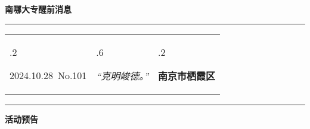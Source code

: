 \documentclass[letterpaper, 12pt]{article}
\begin{document}
\begin{center}
    \Huge\textbf{南哪大专醒前消息}
\end{center}
\vspace{4mm}
\hrule
\renewcommand\tabularxcolumn[1]{m{#1}}
\begin{tabularx}{\textwidth}{>{\hsize.2\hsize}X>{\hsize.6\hsize}X>{\hsize.2\hsize}X}
    \begin{flushleft}
        2024.10.28\, No.101
    \end{flushleft}
    &
    \begin{center}
        \textit{“克明峻德。”}
    \end{center}
    &
    \begin{flushright}
        \textbf{南京市栖霞区}
    \end{flushright}
\end{tabularx}
\vspace{-3.5mm}
\hrule
\vspace{4mm}
\centerline{\huge\textbf{活动预告}}
\end{document}
